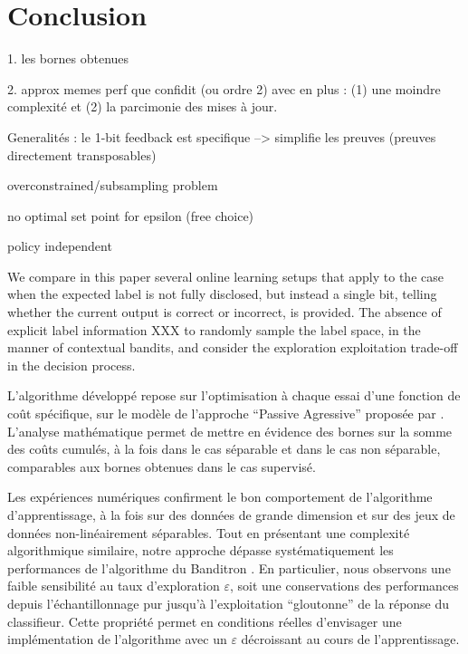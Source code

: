 \documentclass[preprint,12pt,authoryear]{elsarticle}
\begin{document}
\section{Conclusion}
\label{sec:conclusion}

{\color{green}


1. les bornes obtenues

2. approx memes perf que confidit (ou ordre 2) avec en plus : (1) une moindre complexité et (2) la parcimonie des mises à jour. 

Generalités : le 1-bit feedback est specifique --> simplifie les preuves (preuves directement transposables)

overconstrained/subsampling problem

no optimal set point for epsilon (free choice)

policy independent}

We compare in this paper several online learning setups that apply to the case  when the expected label is not fully disclosed, but instead a single bit, telling whether the current output is correct or incorrect, is provided. The  absence of explicit label information XXX to randomly sample the label space, in the manner of contextual bandits, and consider the exploration exploitation trade-off in the decision process. 


L'algorithme développé repose  sur l'optimisation à chaque essai d'une fonction de coût spécifique, sur le modèle de l'approche ``Passive Agressive'' proposée par \cite{crammer2006online}. 
L'analyse mathématique permet de mettre en évidence des bornes sur la somme des coûts cumulés, à la fois dans le cas séparable et dans le cas non séparable, comparables aux bornes obtenues dans le cas supervisé.

Les expériences numériques confirment le bon comportement de l'algorithme d'apprentissage, à la fois sur des données de grande dimension et sur des jeux de données non-linéairement séparables. Tout en présentant une complexité algorithmique similaire, notre approche dépasse systématiquement les performances de l'algorithme du Banditron \cite{kakade2008efficient}. En particulier, nous observons une faible sensibilité au taux d'exploration $\varepsilon$, soit une conservations des performances depuis l'échantillonnage pur jusqu'à l'exploitation ``gloutonne'' de la réponse du classifieur. Cette propriété permet en conditions réelles d'envisager une implémentation de l'algorithme avec un $\varepsilon$ décroissant au cours de l'apprentissage.    
\end{document}
